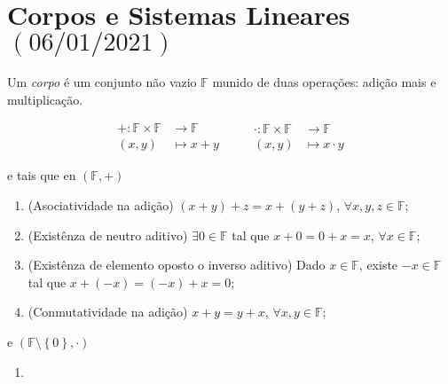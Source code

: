 \chapter{Corpos e Sistemas Lineares\quad$\left(06/01/2021\right)$}

\begin{definition}[Corpo]

	Um \emph{corpo} é um conjunto não vazio $\mathbb{F}$
	munido de duas operações: adição mais e multiplicação.

	\[
		\begin{aligned}
			+\colon\mathbb{F}\times\mathbb{F} & \longrightarrow\mathbb{F} \\
			\left(x,y\right)                  & \longmapsto x+y
		\end{aligned}\qquad
		\begin{aligned}
			\cdot\colon\mathbb{F}\times\mathbb{F} & \longrightarrow\mathbb{F} \\
			\left(x,y\right)                      & \longmapsto x\cdot y
		\end{aligned}
	\]

	e tais que en $\left(\mathbb{F},+\right)$

	\begin{enumerate}[label={(A\arabic*)},leftmargin=0em,itemindent=*]
		\item\label{adição:1}

		      (Asociatividade na adição)
		      $\left(x+y\right)+z=x+\left(y+z\right)$,
		      $\forall x,y,z\in\mathbb{F}$;

		\item\label{adição:2}

		      (Existênza de neutro aditivo)
		      $\exists0\in\mathbb{F}$ tal que $x+0=0+x=x$,
		      $\forall x\in\mathbb{F}$;

		\item\label{adição:3}

		      (Existênza de elemento oposto o inverso aditivo)
		      Dado $x\in\mathbb{F}$, existe $-x\in\mathbb{F}$ tal que
		      $x+\left(-x\right)=\left(-x\right)+x=0$;

		\item\label{adição:4}

		      (Conmutatividade na adição)
		      $x+y=y+x$, $\forall x,y\in\mathbb{F}$;
	\end{enumerate}

	e $\left(\mathbb{F}\setminus\left\{0\right\},\cdot\right)$

	\begin{enumerate}[label={(M\arabic*)},leftmargin=0em,itemindent=*]
		\item\label{multiplicação:1}


\end{enumerate}
\end{definition}
